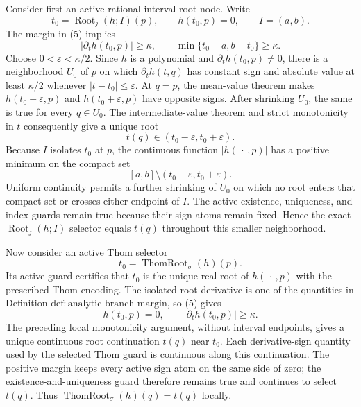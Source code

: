 Consider first an active rational-interval root node.  Write
\[
 t_0=\operatorname{Root}_j(h;I)(p),
 \qquad h(t_0,p)=0,
 \qquad I=(a,b).
\]
The margin in (5) implies
\[
 |\partial_t h(t_0,p)|\geq\kappa,
 \qquad
 \min\{t_0-a,b-t_0\}\geq\kappa. \tag{6}
\]
Choose \(0<\varepsilon<\kappa/2\).  Since \(h\) is a polynomial and \(\partial_t h(t_0,p)\neq0\), there is a neighborhood \(U_0\) of \(p\) on which \(\partial_t h(t,q)\) has constant sign and absolute value at least \(\kappa/2\) whenever \(|t-t_0|\leq\varepsilon\).  At \(q=p\), the mean-value theorem makes \(h(t_0-\varepsilon,p)\) and \(h(t_0+\varepsilon,p)\) have opposite signs.  After shrinking \(U_0\), the same is true for every \(q\in U_0\).  The intermediate-value theorem and strict monotonicity in \(t\) consequently give a unique root
\[
 t(q)\in(t_0-\varepsilon,t_0+\varepsilon). \tag{7}
\]
Because \(I\) isolates \(t_0\) at \(p\), the continuous function \(|h(\,\cdot\,,p)|\) has a positive minimum on the compact set
\[
 [a,b]\setminus(t_0-\varepsilon,t_0+\varepsilon).
\]
Uniform continuity permits a further shrinking of \(U_0\) on which no root enters that compact set or crosses either endpoint of \(I\).  The active existence, uniqueness, and index guards remain true because their sign atoms remain fixed.  Hence the exact \(\operatorname{Root}_j(h;I)\) selector equals \(t(q)\) throughout this smaller neighborhood.

Now consider an active Thom selector
\[
 t_0=\operatorname{ThomRoot}_{\sigma}(h)(p).
\]
Its active guard certifies that \(t_0\) is the unique real root of \(h(\,\cdot\,,p)\) with the prescribed Thom encoding.  The isolated-root derivative is one of the quantities in Definition \(\mathrm{def:analytic\text{-}branch\text{-}margin}\), so (5) gives
\[
 h(t_0,p)=0,
 \qquad |\partial_t h(t_0,p)|\geq\kappa. \tag{8}
\]
The preceding local monotonicity argument, without interval endpoints, gives a unique continuous root continuation \(t(q)\) near \(t_0\).  Each derivative-sign quantity used by the selected Thom guard is continuous along this continuation.  The positive margin keeps every active sign atom on the same side of zero; the existence-and-uniqueness guard therefore remains true and continues to select \(t(q)\).  Thus \(\operatorname{ThomRoot}_{\sigma}(h)(q)=t(q)\) locally.

